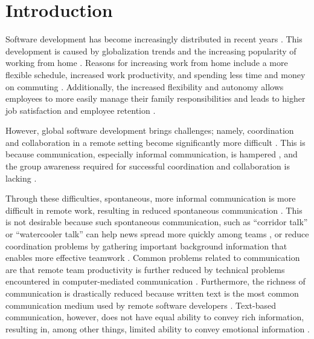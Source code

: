\chapter{Introduction}
\label{chapter:introduction}
Software development has become increasingly distributed in recent years \autocite{herbsleb2001global}. This development is caused by globalization trends \autocite{herbsleb2007global} and the increasing popularity of working from home \autocite{ecoWorkingFromHome2021}. Reasons for increasing work from home include a more flexible schedule, increased work productivity, and spending less time and money on commuting \autocite{flores2019understanding, mulki2009set}. Additionally, the increased flexibility and autonomy allows employees to more easily manage their family responsibilities and leads to higher job satisfaction and employee retention \autocite{mulki2009set, gajendran2007good, madsen2011benefits}.

However, global software development brings challenges; namely, coordination and collaboration in a remote setting become significantly more difficult \autocite{herbsleb2007global}. This is because communication, especially informal communication, is hampered \autocite{sengupta2006research, herbsleb2007global, hinds2005understanding}, and the group awareness required for successful coordination and collaboration is lacking \autocite{herbsleb2007global, gutwin2004group}.

Through these difficulties, spontaneous, more informal communication is more difficult in remote work, resulting in reduced spontaneous communication \autocite{kraut1988patterns, sengupta2006research, herbsleb2007global, hinds2005understanding}. This is not desirable because such spontaneous communication, such as \enquote{corridor talk} or \enquote{watercooler talk} can help news spread more quickly among teams \autocite{herbsleb2000distance}, or reduce coordination problems \autocite{herbsleb1999architectures} by gathering important background information that enables more effective teamwork \autocite{lanubile2007collaboration, herbsleb2001global}. Common problems related to communication are that remote team productivity is further reduced by technical problems encountered in computer-mediated communication \autocite{sengupta2006research}. Furthermore, the richness of communication is drastically reduced because written text is the most common communication medium used by remote software developers \autocite{gutwin2004group}. Text-based communication, however, does not have equal ability to convey rich information, resulting in, among other things, limited ability to convey emotional information \autocite{hook2008interactional}.

